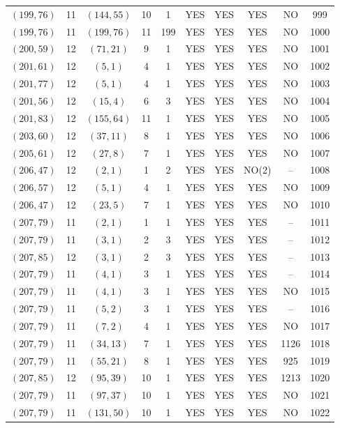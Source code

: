 \begin{longtable}{|c|c|c|c|c|c|c|c|c|c|}
$(199, 76)$ & 11 & $(144, 55)$ & 10 & 1 & YES & YES & YES & NO & 999\\
$(199, 76)$ & 11 & $(199, 76)$ & 11 & 199 & YES & YES & YES & NO & 1000\\
$(200, 59)$ & 12 & $(71, 21)$ & 9 & 1 & YES & YES & YES & NO & 1001\\
$(201, 61)$ & 12 & $(5, 1)$ & 4 & 1 & YES & YES & YES & NO & 1002\\
$(201, 77)$ & 12 & $(5, 1)$ & 4 & 1 & YES & YES & YES & NO & 1003\\
$(201, 56)$ & 12 & $(15, 4)$ & 6 & 3 & YES & YES & YES & NO & 1004\\
$(201, 83)$ & 12 & $(155, 64)$ & 11 & 1 & YES & YES & YES & NO & 1005\\
$(203, 60)$ & 12 & $(37, 11)$ & 8 & 1 & YES & YES & YES & NO & 1006\\
$(205, 61)$ & 12 & $(27, 8)$ & 7 & 1 & YES & YES & YES & NO & 1007\\
$(206, 47)$ & 12 & $(2, 1)$ & 1 & 2 & YES & YES & NO(2) & -- & 1008\\
$(206, 57)$ & 12 & $(5, 1)$ & 4 & 1 & YES & YES & YES & NO & 1009\\
$(206, 47)$ & 12 & $(23, 5)$ & 7 & 1 & YES & YES & YES & NO & 1010\\
$(207, 79)$ & 11 & $(2, 1)$ & 1 & 1 & YES & YES & YES & -- & 1011\\
$(207, 79)$ & 11 & $(3, 1)$ & 2 & 3 & YES & YES & YES & -- & 1012\\
$(207, 85)$ & 12 & $(3, 1)$ & 2 & 3 & YES & YES & YES & -- & 1013\\
$(207, 79)$ & 11 & $(4, 1)$ & 3 & 1 & YES & YES & YES & -- & 1014\\
$(207, 79)$ & 11 & $(4, 1)$ & 3 & 1 & YES & YES & YES & NO & 1015\\
$(207, 79)$ & 11 & $(5, 2)$ & 3 & 1 & YES & YES & YES & -- & 1016\\
$(207, 79)$ & 11 & $(7, 2)$ & 4 & 1 & YES & YES & YES & NO & 1017\\
$(207, 79)$ & 11 & $(34, 13)$ & 7 & 1 & YES & YES & YES & 1126 & 1018\\
$(207, 79)$ & 11 & $(55, 21)$ & 8 & 1 & YES & YES & YES & 925 & 1019\\
$(207, 85)$ & 12 & $(95, 39)$ & 10 & 1 & YES & YES & YES & 1213 & 1020\\
$(207, 79)$ & 11 & $(97, 37)$ & 10 & 1 & YES & YES & YES & NO & 1021\\
$(207, 79)$ & 11 & $(131, 50)$ & 10 & 1 & YES & YES & YES & NO & 1022\\

\end{longtable}
